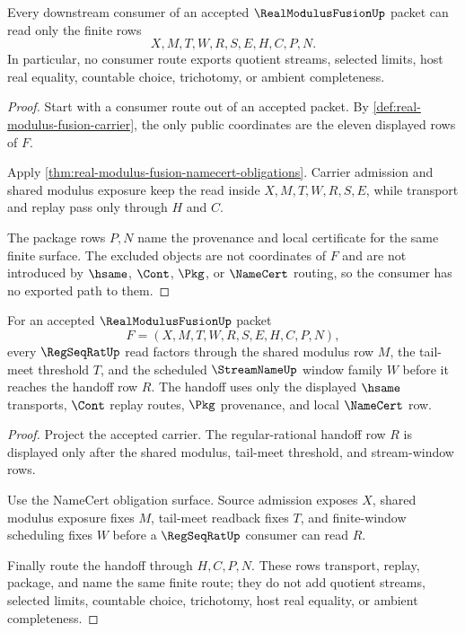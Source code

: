 \begin{theorem}
\label{thm:real-modulus-fusion-nonescape}
Every downstream consumer of an accepted $\RealModulusFusionUp$ packet can read only the finite rows
$$
X,M,T,W,R,S,E,H,C,P,N.
$$
In particular, no consumer route exports quotient streams, selected limits, host real equality, countable choice, trichotomy, or ambient completeness.
\end{theorem}
\begin{proof}
Start with a consumer route out of an accepted packet. By \autoref{def:real-modulus-fusion-carrier}, the only public coordinates are the eleven displayed rows of $F$.

Apply \autoref{thm:real-modulus-fusion-namecert-obligations}. Carrier admission and shared modulus exposure keep the read inside $X,M,T,W,R,S,E$, while transport and replay pass only through $H$ and $C$.

The package rows $P,N$ name the provenance and local certificate for the same finite surface. The excluded objects are not coordinates of $F$ and are not introduced by $\hsame$, $\Cont$, $\Pkg$, or $\NameCert$ routing, so the consumer has no exported path to them.
\end{proof}

\begin{theorem}
\label{thm:real-modulus-fusion-regseq-handoff}
For an accepted $\RealModulusFusionUp$ packet
$$
F=(X,M,T,W,R,S,E,H,C,P,N),
$$
every $\RegSeqRatUp$ read factors through the shared modulus row $M$, the tail-meet threshold $T$, and the scheduled $\StreamNameUp$ window family $W$ before it reaches the handoff row $R$. The handoff uses only the displayed $\hsame$ transports, $\Cont$ replay routes, $\Pkg$ provenance, and local $\NameCert$ row.
\end{theorem}
\begin{proof}
Project the accepted carrier. The regular-rational handoff row $R$ is displayed only after the shared modulus, tail-meet threshold, and stream-window rows.

Use the NameCert obligation surface. Source admission exposes $X$, shared modulus exposure fixes $M$, tail-meet readback fixes $T$, and finite-window scheduling fixes $W$ before a $\RegSeqRatUp$ consumer can read $R$.

Finally route the handoff through $H,C,P,N$. These rows transport, replay, package, and name the same finite route; they do not add quotient streams, selected limits, countable choice, trichotomy, host real equality, or ambient completeness.
\end{proof}

